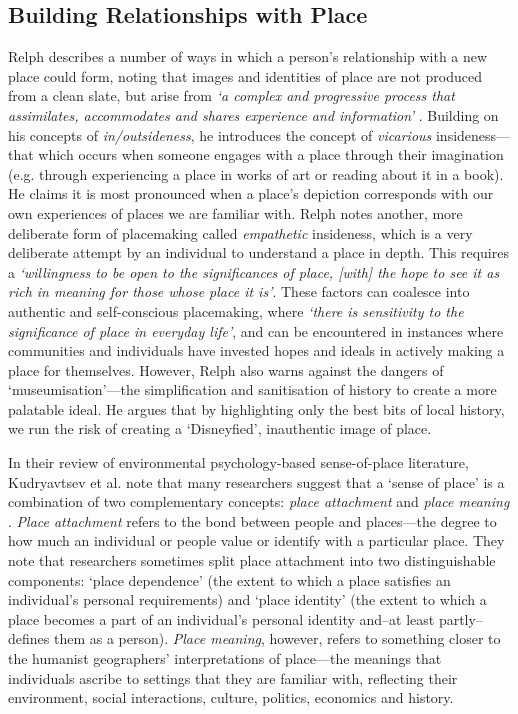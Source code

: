 \subsection{Building Relationships with Place}
Relph describes a number of ways in which a person's relationship with a new place could form, noting that images and identities of place are not produced from a clean slate, but arise from \textit{`a complex and progressive process that assimilates, accommodates and shares experience and information'} \citep{Relph2018}. Building on his concepts of \textit{in/outsideness}, he introduces the concept of \textit{vicarious} insideness---that which occurs when someone engages with a place through their imagination (e.g. through experiencing a place in works of art or reading about it in a book). He claims it is most pronounced when a place's depiction corresponds with our own experiences of places we are familiar with.  Relph notes another, more deliberate form of placemaking called \textit{empathetic} insideness, which is a very deliberate attempt by an individual to understand a place in depth. This requires a \textit{`willingness to be open to the significances of place, [with] the hope to see it as rich in meaning for those whose place it is'}. These factors can coalesce into authentic and self-conscious placemaking, where \textit{`there is sensitivity to the significance of place in everyday life'}, and can be encountered in instances where communities and individuals have invested hopes and ideals in actively making a place for themselves. However, Relph also warns against the dangers of `museumisation'---the simplification and sanitisation of history to create a more palatable ideal. He argues that by highlighting only the best bits of local history, we run the risk of creating a `Disneyfied', inauthentic image of place.

In their review of environmental psychology-based sense-of-place literature, Kudryavtsev et al. note that many researchers suggest that a `sense of place' is a combination of two complementary concepts: \textit{place attachment} and \textit{place meaning} \citep{Kudryavtsev2012}. \textit{Place attachment} refers to the bond between people and places---the degree to how much an individual or people value or identify with a particular place. They note that researchers sometimes split place attachment into two distinguishable components: `place dependence' (the extent to which a place satisfies an individual's personal requirements) and `place identity' (the extent to which a place becomes a part of an individual's personal identity and--at least partly--defines them as a person). \textit{Place meaning}, however, refers to something closer to the humanist geographers' interpretations of place---the meanings that individuals ascribe to settings that they are familiar with, reflecting their environment, social interactions, culture, politics, economics and history. 

